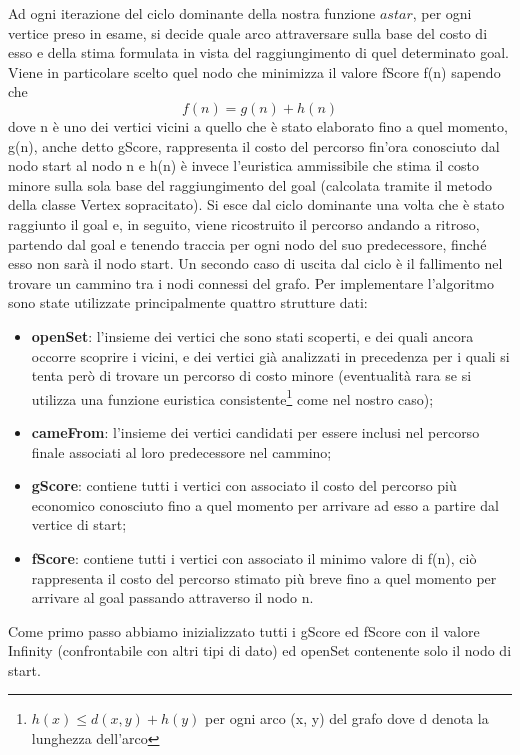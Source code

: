 \documentclass[12pt,a4paper]{report}
\begin{document}
Ad ogni iterazione del ciclo dominante della nostra funzione \(astar\), per ogni vertice preso in esame, si decide quale arco attraversare sulla base del costo di esso e della stima formulata in vista del raggiungimento di quel determinato goal.
Viene in particolare scelto quel nodo che minimizza il valore fScore f(n) sapendo che\[f(n) = g(n) + h(n)\]dove n è uno dei vertici vicini a quello che è stato elaborato fino a quel momento, g(n), anche detto gScore, rappresenta il costo del percorso fin'ora conosciuto dal nodo start al nodo n e h(n) è invece l'euristica ammissibile che stima il costo minore sulla sola base del raggiungimento del goal (calcolata tramite il metodo della classe Vertex sopracitato). Si esce dal ciclo dominante una volta che è stato raggiunto il goal e, in seguito, viene ricostruito il percorso andando a ritroso, partendo dal goal e tenendo traccia per ogni nodo del suo predecessore, finché esso non sarà il nodo start. 
Un secondo caso di uscita dal ciclo è il fallimento nel trovare un cammino tra i nodi connessi del grafo.
\newpage
Per implementare l'algoritmo sono state utilizzate principalmente quattro strutture dati:
\begin{itemize}
	\item \textbf{openSet}: l'insieme dei vertici che sono stati scoperti, e dei quali ancora occorre scoprire i vicini, e dei vertici già analizzati in precedenza per i quali si tenta però di trovare un percorso di costo minore (eventualità rara se si utilizza una funzione euristica consistente\footnote[1]{\(h(x) \leq d(x, y) + h(y)\) per ogni arco (x, y) del grafo dove d denota la lunghezza dell'arco} come nel nostro caso); 
	\item \textbf{cameFrom}: l'insieme dei vertici candidati per essere inclusi nel percorso finale associati al loro predecessore nel cammino;
	\item \textbf{gScore}: contiene tutti i vertici con associato il costo del percorso più economico conosciuto fino a quel momento per arrivare ad esso a partire dal vertice di start;
	\item \textbf{fScore}:  contiene tutti i vertici con associato il minimo valore di f(n), ciò rappresenta il costo del percorso stimato più breve fino a quel momento per arrivare al goal passando attraverso il nodo n. 
\end{itemize}

Come primo passo abbiamo inizializzato tutti i gScore ed fScore con il valore Infinity (confrontabile con altri tipi di dato) ed openSet contenente solo il nodo di start.
\end{document}
